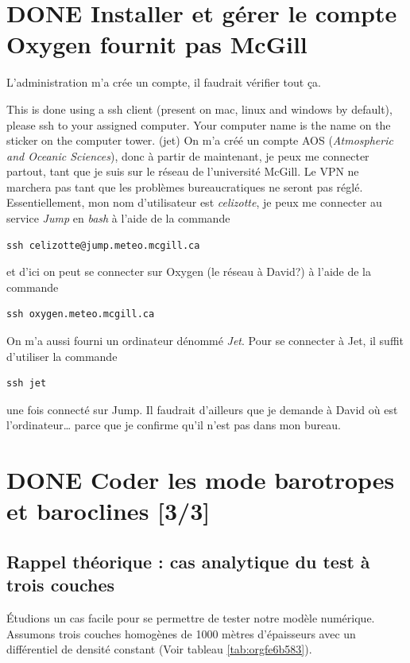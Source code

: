 \documentclass[10pt]{article}
\numberwithin{equation}{section}
\begin{document}
\section{{\bfseries\sffamily DONE} Installer et gérer le compte Oxygen fournit pas McGill}
\label{sec:org746d6ce}
L'administration m'a crée un compte, il faudrait vérifier tout ça.

This is done using a ssh client (present on mac, linux and windows by default), please ssh to your assigned computer. Your computer name is the name on the sticker on the computer tower. (jet)
On m'a créé un compte AOS (\emph{Atmospheric and Oceanic Sciences}), donc à partir de maintenant, je peux me connecter partout, tant que je suis sur le réseau de l'université McGill.
Le VPN ne marchera pas tant que les problèmes bureaucratiques ne seront pas réglé.\\[0pt]

Essentiellement, mon nom d'utilisateur est \emph{celizotte}, je peux me connecter au service \emph{Jump} en \emph{bash} à l'aide de la commande
\begin{verbatim}
ssh celizotte@jump.meteo.mcgill.ca
\end{verbatim}
et d'ici on peut se connecter sur Oxygen (le réseau à David?) à l'aide de la commande
\begin{verbatim}
ssh oxygen.meteo.mcgill.ca
\end{verbatim}

On m'a aussi fourni un ordinateur dénommé \emph{Jet}. Pour se connecter à Jet, il suffit d'utiliser la commande
\begin{verbatim}
ssh jet
\end{verbatim}
une fois connecté sur Jump. Il faudrait d'ailleurs que je demande à David où est l'ordinateur\ldots{} parce que je confirme qu'il n'est pas dans mon bureau.

\section{{\bfseries\sffamily DONE} Coder les mode barotropes et baroclines [3/3]}
\label{sec:org5f65a13}
\subsection{Rappel théorique : cas analytique du test à trois couches}
\label{sec:org9e0faa1}
Étudions un cas facile pour se permettre de tester notre modèle numérique.
Assumons trois couches homogènes de 1000 mètres d'épaisseurs avec un différentiel de densité constant (Voir tableau \ref{tab:orgfe6b583}).
\end{document}
